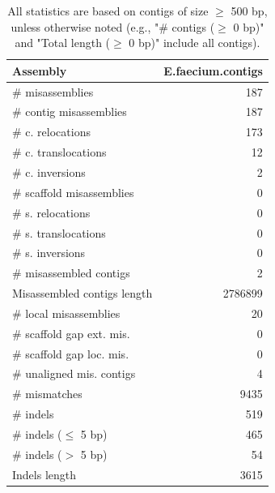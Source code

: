 \documentclass[12pt,a4paper]{article}
\begin{document}
\begin{table}[ht]
\begin{center}
\caption{All statistics are based on contigs of size $\geq$ 500 bp, unless otherwise noted (e.g., "\# contigs ($\geq$ 0 bp)" and "Total length ($\geq$ 0 bp)" include all contigs).}
\begin{tabular}{|l*{1}{|r}|}
\hline
Assembly & E.faecium.contigs \\ \hline
\# misassemblies & 187 \\ \hline
\hspace{2mm}\# contig misassemblies & 187 \\ \hline
\hspace{5mm}\# c. relocations & 173 \\ \hline
\hspace{5mm}\# c. translocations & 12 \\ \hline
\hspace{5mm}\# c. inversions & 2 \\ \hline
\hspace{2mm}\# scaffold misassemblies & 0 \\ \hline
\hspace{5mm}\# s. relocations & 0 \\ \hline
\hspace{5mm}\# s. translocations & 0 \\ \hline
\hspace{5mm}\# s. inversions & 0 \\ \hline
\# misassembled contigs & 2 \\ \hline
Misassembled contigs length & 2786899 \\ \hline
\# local misassemblies & 20 \\ \hline
\# scaffold gap ext. mis. & 0 \\ \hline
\# scaffold gap loc. mis. & 0 \\ \hline
\# unaligned mis. contigs & 4 \\ \hline
\# mismatches & 9435 \\ \hline
\# indels & 519 \\ \hline
\hspace{5mm}\# indels ($\leq$ 5 bp) & 465 \\ \hline
\hspace{5mm}\# indels ($>$ 5 bp) & 54 \\ \hline
Indels length & 3615 \\ \hline
\end{tabular}
\end{center}
\end{table}
\end{document}
